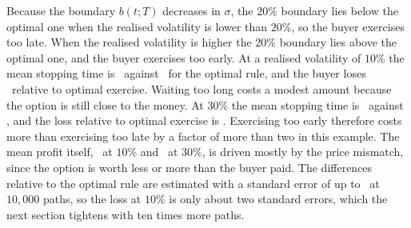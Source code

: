Because the boundary $b(t;T)$ decreases in $\sigma$, the $20\%$ boundary lies below the optimal one when the realised volatility is lower than $20\%$, so the buyer exercises too late.
When the realised volatility is higher the $20\%$ boundary lies above the optimal one, and the buyer exercises too early.
At a realised volatility of $10\%$ the mean stopping time is \MisLowTau\ against \MisLowTauOpt\ for the optimal rule, and the buyer loses \MisLowLoss\ relative to optimal exercise.
Waiting too long costs a modest amount because the option is still close to the money.
At $30\%$ the mean stopping time is \MisHighTau\ against \MisHighTauOpt, and the loss relative to optimal exercise is \MisHighLoss.
Exercising too early therefore costs more than exercising too late by a factor of more than two in this example.
The mean profit itself, \MisLowPnL\ at $10\%$ and \MisHighPnL\ at $30\%$, is driven mostly by the price mismatch, since the option is worth less or more than the buyer paid.
The differences relative to the optimal rule are estimated with a standard error of up to \RegretSE\ at $10{,}000$ paths, so the loss at $10\%$ is only about two standard errors, which the next section tightens with ten times more paths.
